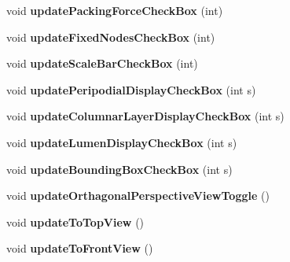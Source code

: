 \begin{DoxyCompactItemize}
\item 
\hypertarget{classMainWindow_abf1716feb02925cadc40800ed5aa1af8}{}void {\bfseries update\+Packing\+Force\+Check\+Box} (int)\label{classMainWindow_abf1716feb02925cadc40800ed5aa1af8}

\item 
\hypertarget{classMainWindow_abd35d297c331bde824461490b7c1bc3f}{}void {\bfseries update\+Fixed\+Nodes\+Check\+Box} (int)\label{classMainWindow_abd35d297c331bde824461490b7c1bc3f}

\item 
\hypertarget{classMainWindow_af7f60ea4eea7ff11fd1f892455d86063}{}void {\bfseries update\+Scale\+Bar\+Check\+Box} (int)\label{classMainWindow_af7f60ea4eea7ff11fd1f892455d86063}

\item 
\hypertarget{classMainWindow_aee2509de2d13eedd782420cf86cd34d6}{}void {\bfseries update\+Peripodial\+Display\+Check\+Box} (int s)\label{classMainWindow_aee2509de2d13eedd782420cf86cd34d6}

\item 
\hypertarget{classMainWindow_a516111157b177a92fc5838a060f36908}{}void {\bfseries update\+Columnar\+Layer\+Display\+Check\+Box} (int s)\label{classMainWindow_a516111157b177a92fc5838a060f36908}

\item 
\hypertarget{classMainWindow_af1aae40f94141865e8d0c670511132f1}{}void {\bfseries update\+Lumen\+Display\+Check\+Box} (int s)\label{classMainWindow_af1aae40f94141865e8d0c670511132f1}

\item 
\hypertarget{classMainWindow_a52aa21a413bbc1f33a84f695b677f490}{}void {\bfseries update\+Bounding\+Box\+Check\+Box} (int s)\label{classMainWindow_a52aa21a413bbc1f33a84f695b677f490}

\item 
\hypertarget{classMainWindow_af2c325c24155eb2198ef705d78d452d8}{}void {\bfseries update\+Orthagonal\+Perspective\+View\+Toggle} ()\label{classMainWindow_af2c325c24155eb2198ef705d78d452d8}

\item 
\hypertarget{classMainWindow_a75a93ee195e391c9172bd77bb5eecd93}{}void {\bfseries update\+To\+Top\+View} ()\label{classMainWindow_a75a93ee195e391c9172bd77bb5eecd93}

\item 
\hypertarget{classMainWindow_a150680b802b4d7d5112209bd19cd3e5a}{}void {\bfseries update\+To\+Front\+View} ()\label{classMainWindow_a150680b802b4d7d5112209bd19cd3e5a}


\end{DoxyCompactItemize}
